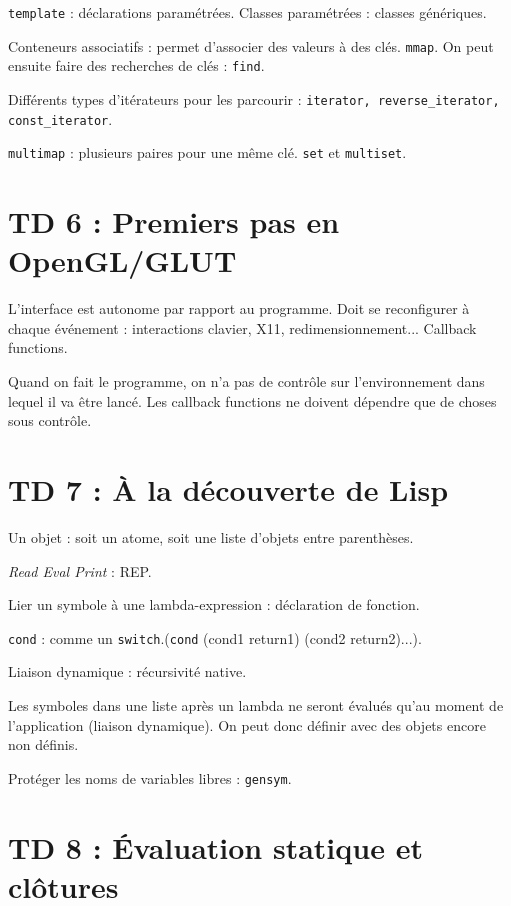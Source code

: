 \documentclass[french]{article}
\def\code#1{\texttt{#1}}
\begin{document}
\code{template} : déclarations paramétrées. Classes paramétrées : classes génériques.

Conteneurs associatifs : permet d'associer des valeurs à des clés. \code{mmap}. On peut ensuite faire des recherches de clés : \code{find}.

Différents types d'itérateurs pour les parcourir : \code{iterator, reverse\_iterator, const\_iterator}.

\code{multimap} : plusieurs paires pour une même clé. \code{set} et \code{multiset}.

\section*{TD 6 : Premiers pas en OpenGL/GLUT}

L'interface est autonome par rapport au programme. Doit se reconfigurer à chaque événement : interactions clavier, X11, redimensionnement... Callback functions.

Quand on fait le programme, on n'a pas de contrôle sur l'environnement dans lequel il va être lancé. Les callback functions ne doivent dépendre que de choses sous contrôle.

\section*{TD 7 : À la découverte de Lisp}

Un objet : soit un atome, soit une liste d'objets entre parenthèses.

\textit{Read Eval Print} : REP.

Lier un symbole à une lambda-expression : déclaration de fonction.

\code{cond} : comme un \code{switch}.(\code{cond} (cond1 return1) (cond2 return2)...).

Liaison dynamique : récursivité native.


Les symboles dans une liste après un lambda ne seront évalués qu'au moment de l'application (liaison dynamique). On peut donc définir avec des objets encore non définis.

Protéger les noms de variables libres : \code{gensym}.

\section*{TD 8 : Évaluation statique et clôtures}
\end{document}
